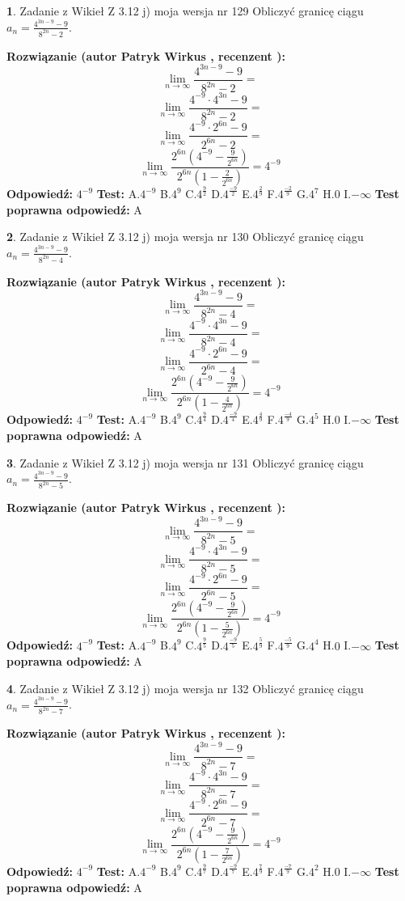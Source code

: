 \documentclass[12pt, a4paper]{article}
\theoremstyle{definition} %
\newtheorem{zad}{}
\newcommand{\zadStart}[1]{\begin{zad}#1\newline}
\newcommand{\zadStop}{\end{zad}}
\newcommand{\rozwStart}[2]{\noindent \textbf{Rozwiązanie (autor #1 , recenzent #2): }\newline}
\newcommand{\rozwStop}{\newline}
\newcommand{\odpStart}{\noindent \textbf{Odpowiedź:}\newline}
\newcommand{\odpStop}{\newline}
\newcommand{\testStart}{\noindent \textbf{Test:}\newline}
\newcommand{\testStop}{\newline}
\newcommand{\kluczStart}{\noindent \textbf{Test poprawna odpowiedź:}\newline}
\newcommand{\kluczStop}{\newline}
\begin{document}
\zadStart{Zadanie z Wikieł Z 3.12 j) moja wersja nr 129}
Obliczyć granicę ciągu $a_{n}=\frac{4^{3n-9}-9}{8^{2n}-2}$.
\zadStop
\rozwStart{Patryk Wirkus}{}
$$\lim\limits_{n\to\infty}\frac{4^{3n-9}-9}{8^{2n}-2}=$$
$$\lim\limits_{n\to\infty}\frac{4^{-9} \cdot 4^{3n}-9}{8^{2n}-2}=$$
$$\lim\limits_{n\to\infty}\frac{4^{-9} \cdot 2^{6n}-9}{2^{6n}-2}=$$
$$\lim\limits_{n\to\infty}\frac{2^{6n}(4^{-9} - \frac{9}{2^{6n}})}{2^{6n}(1-\frac{2}{2^{6n}})}= 4^{-9}$$
\rozwStop
\odpStart
$4^{-9}$
\odpStop
\testStart
A.$4^{-9}$
B.$4^{9}$
C.$4^{\frac{9}{2}}$
D.$4^{\frac{-9}{2}}$
E.$4^{\frac{2}{9}}$
F.$4^{\frac{-2}{9}}$
G.$4^{7}$
H.$0$
I.$-\infty$
\testStop
\kluczStart
A
\kluczStop



\zadStart{Zadanie z Wikieł Z 3.12 j) moja wersja nr 130}
Obliczyć granicę ciągu $a_{n}=\frac{4^{3n-9}-9}{8^{2n}-4}$.
\zadStop
\rozwStart{Patryk Wirkus}{}
$$\lim\limits_{n\to\infty}\frac{4^{3n-9}-9}{8^{2n}-4}=$$
$$\lim\limits_{n\to\infty}\frac{4^{-9} \cdot 4^{3n}-9}{8^{2n}-4}=$$
$$\lim\limits_{n\to\infty}\frac{4^{-9} \cdot 2^{6n}-9}{2^{6n}-4}=$$
$$\lim\limits_{n\to\infty}\frac{2^{6n}(4^{-9} - \frac{9}{2^{6n}})}{2^{6n}(1-\frac{4}{2^{6n}})}= 4^{-9}$$
\rozwStop
\odpStart
$4^{-9}$
\odpStop
\testStart
A.$4^{-9}$
B.$4^{9}$
C.$4^{\frac{9}{4}}$
D.$4^{\frac{-9}{4}}$
E.$4^{\frac{4}{9}}$
F.$4^{\frac{-4}{9}}$
G.$4^{5}$
H.$0$
I.$-\infty$
\testStop
\kluczStart
A
\kluczStop



\zadStart{Zadanie z Wikieł Z 3.12 j) moja wersja nr 131}
Obliczyć granicę ciągu $a_{n}=\frac{4^{3n-9}-9}{8^{2n}-5}$.
\zadStop
\rozwStart{Patryk Wirkus}{}
$$\lim\limits_{n\to\infty}\frac{4^{3n-9}-9}{8^{2n}-5}=$$
$$\lim\limits_{n\to\infty}\frac{4^{-9} \cdot 4^{3n}-9}{8^{2n}-5}=$$
$$\lim\limits_{n\to\infty}\frac{4^{-9} \cdot 2^{6n}-9}{2^{6n}-5}=$$
$$\lim\limits_{n\to\infty}\frac{2^{6n}(4^{-9} - \frac{9}{2^{6n}})}{2^{6n}(1-\frac{5}{2^{6n}})}= 4^{-9}$$
\rozwStop
\odpStart
$4^{-9}$
\odpStop
\testStart
A.$4^{-9}$
B.$4^{9}$
C.$4^{\frac{9}{5}}$
D.$4^{\frac{-9}{5}}$
E.$4^{\frac{5}{9}}$
F.$4^{\frac{-5}{9}}$
G.$4^{4}$
H.$0$
I.$-\infty$
\testStop
\kluczStart
A
\kluczStop



\zadStart{Zadanie z Wikieł Z 3.12 j) moja wersja nr 132}
Obliczyć granicę ciągu $a_{n}=\frac{4^{3n-9}-9}{8^{2n}-7}$.
\zadStop
\rozwStart{Patryk Wirkus}{}
$$\lim\limits_{n\to\infty}\frac{4^{3n-9}-9}{8^{2n}-7}=$$
$$\lim\limits_{n\to\infty}\frac{4^{-9} \cdot 4^{3n}-9}{8^{2n}-7}=$$
$$\lim\limits_{n\to\infty}\frac{4^{-9} \cdot 2^{6n}-9}{2^{6n}-7}=$$
$$\lim\limits_{n\to\infty}\frac{2^{6n}(4^{-9} - \frac{9}{2^{6n}})}{2^{6n}(1-\frac{7}{2^{6n}})}= 4^{-9}$$
\rozwStop
\odpStart
$4^{-9}$
\odpStop
\testStart
A.$4^{-9}$
B.$4^{9}$
C.$4^{\frac{9}{7}}$
D.$4^{\frac{-9}{7}}$
E.$4^{\frac{7}{9}}$
F.$4^{\frac{-7}{9}}$
G.$4^{2}$
H.$0$
I.$-\infty$
\testStop
\kluczStart
A
\kluczStop
\end{document}

